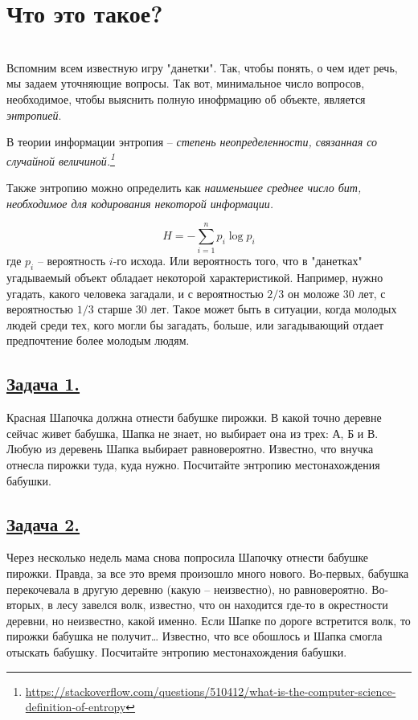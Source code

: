 \section*{Что это такое?}~\
\\

Вспомним всем известную игру "данетки". Так, чтобы понять, о чем идет речь, мы задаем уточняющие вопросы. Так вот, минимальное число вопросов, необходимое, чтобы выяснить полную инофрмацию об объекте, является \textit{энтропией}.

В теории информации энтропия -- \textit{степень неопределенности, связанная со случайной величиной.\footnote{\url{https://stackoverflow.com/questions/510412/what-is-the-computer-science-definition-of-entropy}}}

Также энтропию можно определить как \textit{наименьшее среднее число бит, необходимое для кодирования некоторой информации.}

\[H=-\sum\limits_{i=1}^n p_i\log p_i \]
где $p_i$ -- вероятность $i$-го исхода. Или вероятность того, что в "данетках" угадываемый объект обладает некоторой характеристикой. Например, нужно угадать, какого человека загадали, и с вероятностью $2/3$ он моложе 30 лет, с вероятностью $1/3$ старше 30 лет. Такое может быть в ситуации, когда молодых людей среди тех, кого могли бы загадать, больше, или загадывающий отдает предпочтение более молодым людям. 

\subsection*{\hyperref[sec:sol_problem1]{Задача 1.}}\label{sec:problem1} 
Красная Шапочка должна отнести бабушке пирожки. В какой точно деревне сейчас живет бабушка, Шапка не знает, но выбирает она из трех: А, Б и В. Любую из деревень Шапка выбирает равновероятно. Известно, что внучка отнесла пирожки туда, куда нужно. Посчитайте энтропию местонахождения бабушки.

\subsection*{\hyperref[sec:sol_problem2]{Задача 2.}}\label{sec:problem2}  Через несколько недель мама снова попросила Шапочку отнести бабушке пирожки. Правда, за все это время произошло много нового. Во-первых, бабушка перекочевала в другую деревню (какую – неизвестно), но равновероятно. Во-вторых, в лесу завелся волк, известно, что он находится где-то в окрестности деревни, но неизвестно, какой именно. Если Шапке по дороге встретится волк, то пирожки бабушка не получит… Известно, что все обошлось и Шапка смогла отыскать бабушку. Посчитайте энтропию местонахождения бабушки.

